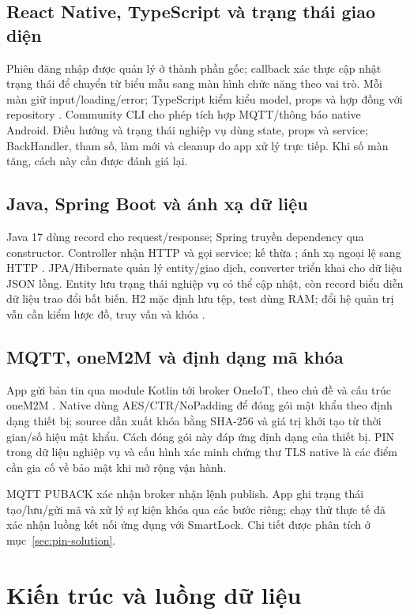 \subsection{React Native, TypeScript và trạng thái giao diện}
Phiên đăng nhập được quản lý ở thành phần gốc; callback xác thực cập nhật trạng thái để chuyển từ biểu mẫu sang màn hình chức năng theo vai trò. Mỗi màn giữ input/loading/error; TypeScript kiểm kiểu model, props và hợp đồng với repository \cite{react,typescript}. Community CLI cho phép tích hợp MQTT/thông báo native Android. Điều hướng và trạng thái nghiệp vụ dùng state, props và service; BackHandler, tham số, làm mới và cleanup do app xử lý trực tiếp. Khi số màn tăng, cách này cần được đánh giá lại.

\subsection{Java, Spring Boot và ánh xạ dữ liệu}
Java 17 dùng record cho request/response; Spring truyền dependency qua constructor. Controller nhận HTTP và gọi service;  kế thừa ;  ánh xạ ngoại lệ sang HTTP \cite{spring}. JPA/Hibernate quản lý entity/giao dịch, converter triển khai  cho dữ liệu JSON lồng. Entity lưu trạng thái nghiệp vụ có thể cập nhật, còn record biểu diễn dữ liệu trao đổi bất biến. H2 mặc định lưu tệp, test dùng RAM; đổi hệ quản trị vẫn cần kiểm lược đồ, truy vấn và khóa \cite{h2}.

\subsection{MQTT, oneM2M và định dạng mã khóa}
App gửi bản tin qua module Kotlin tới broker OneIoT, theo chủ đề và cấu trúc oneM2M \cite{mqtt,onem2m}. Native dùng AES/CTR/NoPadding để đóng gói mật khẩu theo định dạng thiết bị; source dẫn xuất khóa bằng SHA-256 và giá trị khởi tạo từ thời gian/số hiệu mật khẩu. Cách đóng gói này đáp ứng định dạng của thiết bị. PIN trong dữ liệu nghiệp vụ và cấu hình xác minh chứng thư TLS native là các điểm cần gia cố về bảo mật khi mở rộng vận hành.

MQTT PUBACK xác nhận broker nhận lệnh publish. App ghi trạng thái tạo/lưu/gửi mã và xử lý sự kiện khóa qua các bước riêng; chạy thử thực tế đã xác nhận luồng kết nối ứng dụng với SmartLock. Chi tiết được phân tích ở mục~\ref{sec:pin-solution}.

\FloatBarrier
\section{Kiến trúc và luồng dữ liệu}
